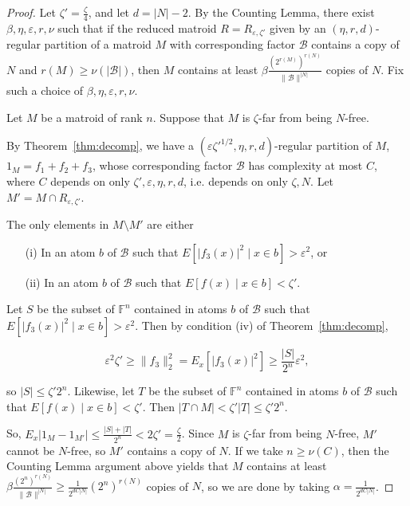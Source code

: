 \documentclass{article}
\theoremstyle{plain}
\theoremstyle{definition}
\theoremstyle{definition}
\theoremstyle{remark}
\numberwithin{equation}{section}
\newcommand{\FF}{\mathbb{F}}
\newcommand{\cB}{\mathcal B}
\begin{document}
\begin{proof}
Let $\zeta'=\frac{\zeta}{4}$, and let $d=|N|-2$. By the Counting Lemma, there exist $\beta, \eta, \varepsilon, r, \nu$ such that if the reduced matroid $R=R_{\varepsilon,\zeta'}$ given by an $(\eta,r,d)$-regular partition of a matroid $M$ with corresponding factor $\cB$ contains a copy of $N$ and $r(M)\geq \nu(|\cB|)$, then $M$ contains at least $\beta \frac{(2^{r(M)})^{r(N)}}{\|\cB\|^{|N|}}$ copies of $N$. Fix such a choice of $\beta,\eta,\varepsilon,r,\nu$.

Let $M$ be a matroid of rank $n$. Suppose that $M$ is $\zeta$-far from being $N$-free.

By Theorem~\ref{thm:decomp}, we have a $(\varepsilon \zeta'^{1/2},\eta,r,d)$-regular partition of $M$, $1_M=f_1+f_2+f_3$, whose corresponding factor $\cB$ has complexity at most $C$, where $C$ depends on only $\zeta',\varepsilon, \eta,r,d$, i.e. depends on only $\zeta, N$. Let $M'=M\cap R_{\varepsilon,\zeta'}$.

The only elements in $M\setminus M'$ are either
\begin{itemize}
    \item[(i)] In an atom $b$ of $\cB$ such that $E[|f_3(x)|^2\mid x\in b]>\varepsilon^2$, or
    \item[(ii)] In an atom $b$ of $\cB$ such that $E[f(x)\mid x\in b]<\zeta'$.
\end{itemize}

Let $S$ be the subset of $\FF^{n}$ contained in atoms $b$ of $\cB$ such that $E[|f_3(x)|^2\mid x\in b]>\varepsilon^2$. Then by condition (iv) of Theorem~\ref{thm:decomp},

\[ \varepsilon^2 \zeta' \geq \|f_3\|_2^2=E_x[|f_3(x)|^2] \geq \frac{|S|}{2^n} \varepsilon^2, \]

so $|S|\leq \zeta' 2^n$. Likewise, let $T$ be the subset of $\FF^n$ contained in atoms $b$ of $\cB$ such that $E[f(x)\mid x\in b]<\zeta'$. Then $|T\cap M|< \zeta' |T|\leq \zeta' 2^n$.

So, $E_x{|1_M-1_{M'}|}\leq \frac{|S|+|T|}{2^n} < 2\zeta'=\frac{\zeta}{2}$. Since $M$ is $\zeta$-far from being $N$-free, $M'$ cannot be $N$-free, so $M'$ contains a copy of $N$. If we take $n\geq \nu(C)$, then the Counting Lemma argument above yields that $M$ contains at least $\beta \frac{(2^{n})^{r(N)}}{\|\cB\|^{|N|}}\geq \frac{1}{2^{dC|N|}}(2^{n})^{r(N)}$ copies of $N$, so we are done by taking $\alpha = \frac{1}{2^{dC|N|}}$.

\end{proof}
\end{document}
